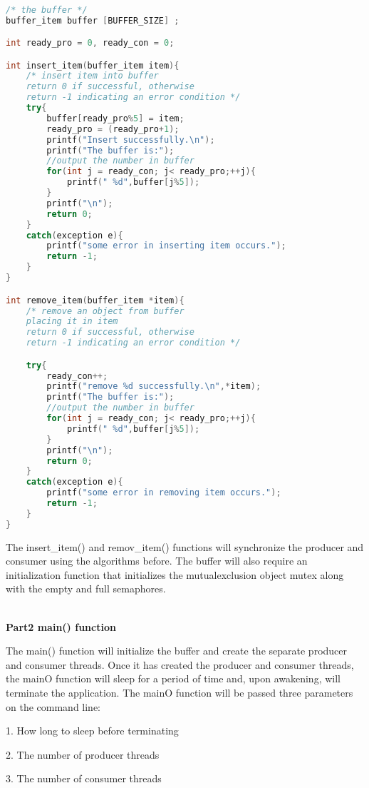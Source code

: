 \documentclass[12pt,a4paper]{article}
\begin{document}
\begin{lstlisting}[language=C++]

/* the buffer */ 
buffer_item buffer [BUFFER_SIZE] ;

int ready_pro = 0, ready_con = 0;

int insert_item(buffer_item item){
	/* insert item into buffer 
	return 0 if successful, otherwise 
	return -1 indicating an error condition */
	try{
		buffer[ready_pro%5] = item;
		ready_pro = (ready_pro+1);
		printf("Insert successfully.\n");
		printf("The buffer is:");
		//output the number in buffer
		for(int j = ready_con; j< ready_pro;++j){   
			printf(" %d",buffer[j%5]);
		}
		printf("\n");
		return 0;
	}
	catch(exception e){
		printf("some error in inserting item occurs.");
		return -1;
	}
}

int remove_item(buffer_item *item){
	/* remove an object from buffer 
	placing it in item 
	return 0 if successful, otherwise 
	return -1 indicating an error condition */

	try{
		ready_con++;
		printf("remove %d successfully.\n",*item);
		printf("The buffer is:");
		//output the number in buffer
		for(int j = ready_con; j< ready_pro;++j){    	
			printf(" %d",buffer[j%5]);
		}
		printf("\n");
		return 0;
	}
	catch(exception e){
		printf("some error in removing item occurs.");
		return -1;
	}
}
\end{lstlisting}

The insert\_item() and remov\_item() functions will synchronize the producer and consumer using the algorithms before. The buffer will also require an initialization function that initializes the mutualexclusion object mutex along with the empty and full semaphores. 

~\\
\textbf{Part2 main() function}

The main() function will initialize the buffer and create the separate producer and consumer threads. Once it has created the producer and consumer threads, the mainO function will sleep for a period of time and, upon awakening, will terminate the application. The mainO function will be passed three parameters on the command line:

1. How long to sleep before terminating

2. The number of producer threads

3. The number of consumer threads
\end{document}
